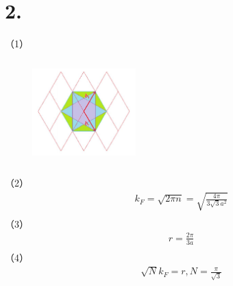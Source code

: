 \documentclass[UTF8]{ctexart}
\begin{document}
\section*{2.}
（1）
\begin{figure}[H]                                         
    \centering                                                
    \includegraphics[width=4cm,height=4cm]{ans-2-1.jpg}        
    \caption*{}                                                                                  
\end{figure}
（2）
\begin{equation*}
    \begin{aligned}
        & k_F=\sqrt{2\pi n}=\sqrt{\frac{4\pi}{3\sqrt3 a^2}}\\
    \end{aligned}
\end{equation*}
（3）
\begin{equation*}
    \begin{aligned}
        & r=\frac{2\pi}{3a}\\
    \end{aligned}
\end{equation*}
（4）
\begin{equation*}
    \begin{aligned}
        & \sqrt{N}k_F=r, N=\frac{\pi}{\sqrt3}\\
    \end{aligned}
\end{equation*}
\end{document}

